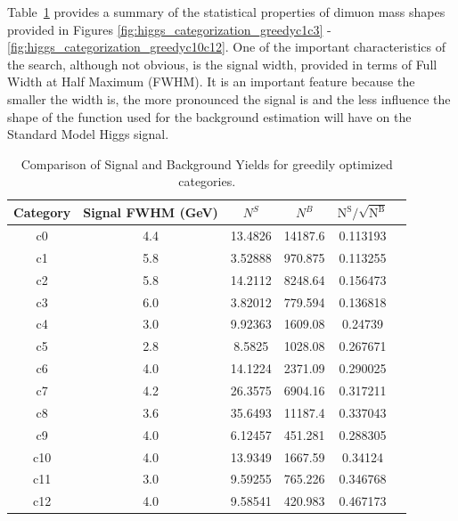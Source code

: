
Table~\ref{tab:higgs_categorization_yields} provides a summary of the statistical properties of dimuon mass shapes provided in Figures \ref{fig:higgs_categorization_greedyc1c3} - \ref{fig:higgs_categorization_greedyc10c12}. One of the important characteristics of the search, although not obvious, is the signal width, provided in terms of Full Width at Half Maximum (FWHM). It is an important feature because the smaller the width is, the more pronounced the signal is and the less influence the shape of the function used for the background estimation will have on the Standard Model Higgs signal.
\begin{table}[htb]
  \caption{Comparison of Signal and Background Yields for greedily optimized categories.}
  \label{tab:higgs_categorization_yields}
  \begin{center}
    \begin{tabular}{|c|c|c|c|c|c|}
      \hline
      Category  & Signal FWHM (GeV) & $N^{S}$ & $N^{B}$ & $\mathrm{N^S / \sqrt{N^B}}$ \\
      \hline
      c0 & 4.4 & 13.4826 & 14187.6 & 0.113193\\
      c1 & 5.8 & 3.52888 & 970.875 & 0.113255\\
      c2 & 5.8 & 14.2112 & 8248.64 & 0.156473\\
      c3 & 6.0 & 3.82012 & 779.594 & 0.136818\\
      c4 & 3.0 & 9.92363 & 1609.08 & 0.24739\\
      c5 & 2.8 & 8.5825  & 1028.08 & 0.267671\\
      c6 & 4.0 & 14.1224 & 2371.09 & 0.290025\\
      c7 & 4.2 & 26.3575 & 6904.16 & 0.317211\\
      c8 & 3.6 & 35.6493 & 11187.4 & 0.337043\\
      c9 & 4.0 & 6.12457 & 451.281 & 0.288305\\
      c10 & 4.0 & 13.9349 & 1667.59 & 0.34124\\
      c11 & 3.0 & 9.59255 & 765.226 & 0.346768\\
      c12 & 4.0 & 9.58541 & 420.983 & 0.467173\\
      \hline
    \end{tabular}
  \end{center}
\end{table}


